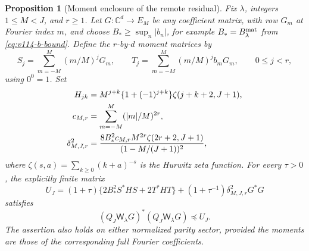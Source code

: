 \documentclass[11pt]{article}
\newtheorem{proposition}[theorem]{Proposition}
\theoremstyle{remark}
\begin{document}
\begin{proposition}[Moment enclosure of the remote residual]
\label{prop:v116-remote-moment}
Fix $\lambda$, integers $1\le M<J$, and $r\ge1$.  Let
$G:\mathbb C^d\to E_M$ be any coefficient matrix, with row $G_m$ at
Fourier index $m$, and choose $B_*\ge\sup_n|b_n|$, for example
$B_*=B_\lambda^{\rm mat}$ from \eqref{eq:v114-b-bound}.
Define the $r$-by-$d$ moment matrices by
\begin{equation}\label{eq:v116-moments}
 S_j=\sum_{m=-M}^M(m/M)^jG_m,\qquad
 T_j=\sum_{m=-M}^M(m/M)^j b_mG_m,
 \qquad 0\le j<r,
\end{equation}
using $0^0=1$.  Set
\begin{align}
 H_{jk}&=M^{j+k}\{1+(-1)^{j+k}\}
                  \zeta(j+k+2,J+1),\notag\\
 c_{M,r}&=\sum_{m=-M}^M(|m|/M)^{2r},\notag\\
 \delta_{M,J,r}^{2}
 &=\frac{8B_*^2c_{M,r}M^{2r}\zeta(2r+2,J+1)}
                    {(1-M/(J+1))^2},
 \label{eq:v116-moment-constants}
\end{align}
where $\zeta(s,a)=\sum_{k\ge0}(k+a)^{-s}$ is the Hurwitz zeta
function.  For every $\tau>0$, the explicitly finite matrix
\begin{equation}\label{eq:v116-remote-bound}
 U_J=(1+\tau)\{2B_*^2S^*HS+2T^*HT\}
       +(1+\tau^{-1})\delta_{M,J,r}^{2}G^*G
\end{equation}
satisfies
\[
 (Q_J\mathsf W_\lambda G)^*(Q_J\mathsf W_\lambda G)\preceq U_J.
\]
The assertion also holds on either normalized parity sector, provided
the moments are those of the corresponding full Fourier coefficients.
\end{proposition}
\end{document}
